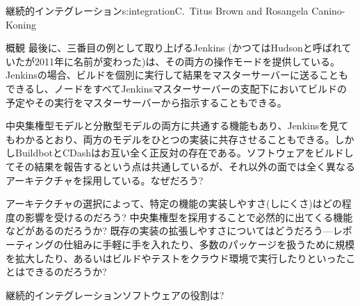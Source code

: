 \begin{aosachapter}{継続的インテグレーション}{s:integration}{C.\ Titus Brown and Rosangela Canino-Koning}
\begin{aosasect1}{概観}
最後に、三番目の例として取り上げるJenkins (かつてはHudsonと呼ばれていたが2011年に名前が変わった)は、その両方の操作モードを提供している。Jenkinsの場合、ビルドを個別に実行して結果をマスターサーバーに送ることもできるし、ノードをすべてJenkinsマスターサーバーの支配下においてビルドの予定やその実行をマスターサーバーから指示することもできる。

中央集権型モデルと分散型モデルの両方に共通する機能もあり、Jenkinsを見てもわかるとおり、両方のモデルをひとつの実装に共存させることもできる。しかしBuildbotとCDashはお互い全く正反対の存在である。ソフトウェアをビルドしてその結果を報告するという点は共通しているが、それ以外の面では全く異なるアーキテクチャを採用している。なぜだろう?

アーキテクチャの選択によって、特定の機能の実装しやすさ(しにくさ)はどの程度の影響を受けるのだろう? 中央集権型を採用することで必然的に出てくる機能などがあるのだろうか? 既存の実装の拡張しやすさについてはどうだろう---レポーティングの仕組みに手軽に手を入れたり、多数のパッケージを扱うために規模を拡大したり、あるいはビルドやテストをクラウド環境で実行したりといったことはできるのだろうか?

\begin{aosasect2}{継続的インテグレーションソフトウェアの役割は?}


\end{aosasect2}
\end{aosasect1}
\end{aosachapter}
